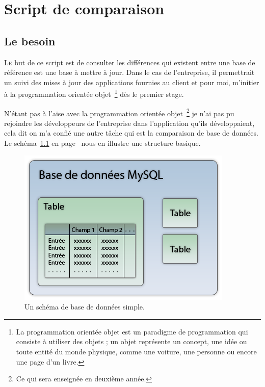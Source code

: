 \chapter{Script de comparaison} %
\label{cha:Script de comparaison}

\section{Le besoin} %
\label{sec:Le besoin}

\lettrine{L}{e} but de ce script est de consulter les différences qui
existent entre une base de référence est une base à mettre à jour. Dans
le cas de l'entreprise, il permettrait un suivi des mises à jour des
applications fournies au client et pour moi, m'initier à la
programmation orientée objet\, \footnote{La programmation orientée objet
est un paradigme de programmation qui consiste à utiliser des objets ;
un objet représente un concept, une idée ou toute entité du monde
physique, comme une voiture, une personne ou encore une page d'un
livre.} dès le premier stage.

N'étant pas à l'aise avec la programmation orientée objet\, \footnote{Ce
qui sera enseignée en deuxième année.} je n'ai pas pu rejoindre les
développeurs de l'entreprise dans l'application qu'ils développaient,
cela dit on m'a confié une autre tâche qui est la comparaison de base de
données. Le schéma~\ref{bdd} en page~\pageref{bdd} nous en illustre une
structure basique.

\begin{figure}
    \begin{center}
        \includegraphics[scale=0.7]{images/bdd.png}
        \caption{Un schéma de base de données simple.}
        \label{bdd}
    \end{center}
\end{figure}

